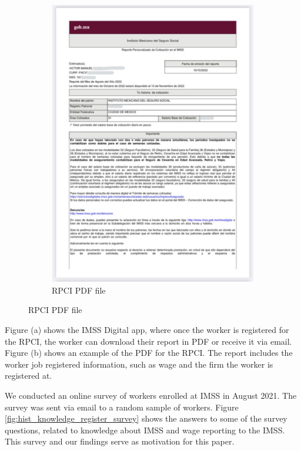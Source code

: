 \documentclass[10pt, oneside]{book}
\begin{document}
\begin{figure}[H]
\begin{center}
\begin{subfigure}{0.49\textwidth}
    \end{subfigure}
    \begin{subfigure}{0.49\textwidth}
    \caption{RPCI PDF file}
    \includegraphics[width=\textwidth]{04_Figures/rpci_app/rpci_3.png}
    \end{subfigure}
    

    \end{center}
\end{figure}
\scriptsize{
\noindent Figure (a) shows the IMSS Digital app, where once the worker is registered for the RPCI, the worker can download their report in PDF or receive it via email. Figure (b) shows an example of the PDF for the RPCI. The report includes the worker job registered information, such as wage and the firm the worker is registered at.
} \\

\normalsize

We conducted an online survey of workers enrolled at IMSS in August 2021. The survey was sent via email to a random sample of workers. Figure \ref{fig:hist_knowledge_register_survey} shows the answers to some of the survey questions, related to knowledge about IMSS and wage reporting to the IMSS. This survey and our findings serve as motivation for this paper. \\
\end{document}
